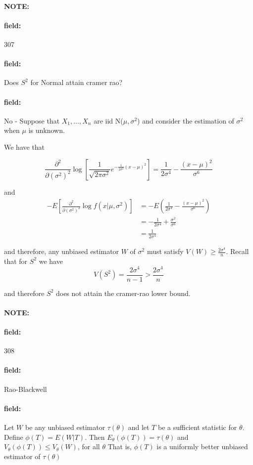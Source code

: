 \documentclass[12pt]{article}
\newenvironment{note}{\paragraph{NOTE:}}{}
\newenvironment{field}{\paragraph{field:}}{}
\begin{document}
\begin{note} \begin{field} \tiny 307 \end{field}
  \begin{field}
    Does $S^2$ for Normal attain cramer rao?
  \end{field}
  \begin{field}
    No -
    Suppose that $X_1, \ldots , X_n$ are iid N($\mu,\sigma^2$)
    and consider the estimation of $\sigma^2$ when $\mu$ is unknown.

    We have that

    $$ \frac{\partial ^2 }{\partial (\sigma^2) ^2} \log [ \frac{1}{\sqrt{2\pi\sigma^2}} e^{-\frac{1}{2\sigma^2}(x-\mu)^2}] = \frac{1}{2\sigma^4} - \frac{(x-\mu)^2}{\sigma^6}$$

    and
    \begin{align*}
      -E[\frac{\partial ^2 }{\partial (\sigma^2)^2 } \log f(x|\mu,\sigma^2)] &= -E(\frac{1}{2\sigma^4} - \frac{(x-\mu)^2}{\sigma^6})\\
      &= -\frac{1}{2\sigma^4} + \frac{\sigma^2}{\sigma^6}\\
      &= \frac{1}{2\sigma^4}
    \end{align*}

    and therefore, any unbiased estimator $W$ of $\sigma^2$ must satisfy $V(W) \geq \frac{2\sigma^4}{n}$. Recall that for $S^2$ we have $$V(S^2) = \frac{2\sigma^4}{n-1} > \frac{2\sigma^4}{n}$$

    and therefore $S^2$ does not attain the cramer-rao lower bound.

  \end{field}
\end{note}

\begin{note} \begin{field} \tiny 308 \end{field}
  \begin{field}
    Rao-Blackwell
  \end{field}
  \begin{field}
    Let $W$ be any unbiased estimator $\tau(\theta)$ and let $T$ be a sufficient statistic for $\theta$. Define $\phi(T) = E(W|T)$. Then $E_\theta(\phi(T)) = \tau(\theta)$ and $V_\theta(\phi(T))\leq V_\theta(W)$, for all $\theta$
    That is, $\phi(T)$ is a uniformly better unbiased estimator of $\tau(\theta)$
  \end{field}
\end{note}
\end{document}

